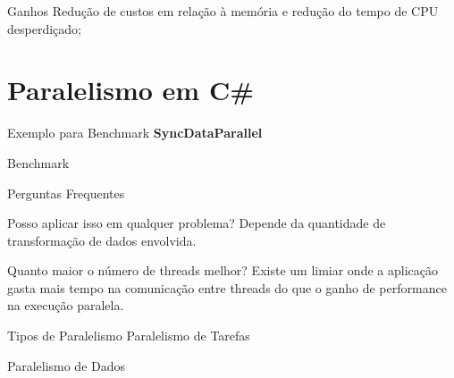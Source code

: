 \documentclass[10pt]{beamer}
\begin{document}
\begin{frame}{Ganhos}
	\vspace{0.5cm}
	Redução de custos em relação à memória e redução do tempo de CPU desperdiçado; 
\end{frame}

\section{Paralelismo em C\#}

\begin{frame}{Exemplo para Benchmark}
	\textbf{SyncDataParallel}
\end{frame}

\begin{frame}{Benchmark}
	\begin{figure}
	\end{figure}
\end{frame}


\begin{frame}{Perguntas Frequentes}
	\begin{exampleblock}{Posso aplicar isso em qualquer problema?}
		Depende da quantidade de transformação de dados envolvida.
	\end{exampleblock}
	\begin{exampleblock}{Quanto maior o número de threads melhor?}
		Existe um limiar onde a aplicação gasta mais tempo na comunicação entre threads do que o ganho de performance na execução paralela.
	\end{exampleblock}
\end{frame}

\begin{frame}{Tipos de Paralelismo}
	Paralelismo de Tarefas
	
	Paralelismo de Dados
\end{frame}
\end{document}
